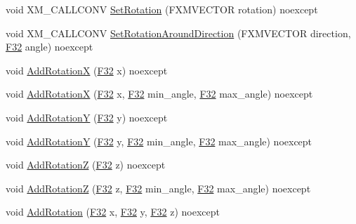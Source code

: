 \begin{DoxyCompactItemize}
\item 
void X\+M\+\_\+\+C\+A\+L\+L\+C\+O\+NV \mbox{\hyperlink{classmage_1_1_transform_a66ddc77bfbbf0b66e00d5ec8e10d1d65}{Set\+Rotation}} (F\+X\+M\+V\+E\+C\+T\+OR rotation) noexcept
\item 
void X\+M\+\_\+\+C\+A\+L\+L\+C\+O\+NV \mbox{\hyperlink{classmage_1_1_transform_abcf9353c078e2556543919e0852abb05}{Set\+Rotation\+Around\+Direction}} (F\+X\+M\+V\+E\+C\+T\+OR direction, \mbox{\hyperlink{namespacemage_aa97e833b45f06d60a0a9c4fc22ae02c0}{F32}} angle) noexcept
\item 
void \mbox{\hyperlink{classmage_1_1_transform_a920bcbc350d3896bd1d8f9f6233cc008}{Add\+RotationX}} (\mbox{\hyperlink{namespacemage_aa97e833b45f06d60a0a9c4fc22ae02c0}{F32}} x) noexcept
\item 
void \mbox{\hyperlink{classmage_1_1_transform_a7d8d633022365c5d78c293dec6179f3b}{Add\+RotationX}} (\mbox{\hyperlink{namespacemage_aa97e833b45f06d60a0a9c4fc22ae02c0}{F32}} x, \mbox{\hyperlink{namespacemage_aa97e833b45f06d60a0a9c4fc22ae02c0}{F32}} min\+\_\+angle, \mbox{\hyperlink{namespacemage_aa97e833b45f06d60a0a9c4fc22ae02c0}{F32}} max\+\_\+angle) noexcept
\item 
void \mbox{\hyperlink{classmage_1_1_transform_ab9e20e922cd6e651a984480aa0aa6752}{Add\+RotationY}} (\mbox{\hyperlink{namespacemage_aa97e833b45f06d60a0a9c4fc22ae02c0}{F32}} y) noexcept
\item 
void \mbox{\hyperlink{classmage_1_1_transform_aba11b5ece5d2885d18a97178b908e16b}{Add\+RotationY}} (\mbox{\hyperlink{namespacemage_aa97e833b45f06d60a0a9c4fc22ae02c0}{F32}} y, \mbox{\hyperlink{namespacemage_aa97e833b45f06d60a0a9c4fc22ae02c0}{F32}} min\+\_\+angle, \mbox{\hyperlink{namespacemage_aa97e833b45f06d60a0a9c4fc22ae02c0}{F32}} max\+\_\+angle) noexcept
\item 
void \mbox{\hyperlink{classmage_1_1_transform_a973e713992328de9f5ad3b6ed4779f40}{Add\+RotationZ}} (\mbox{\hyperlink{namespacemage_aa97e833b45f06d60a0a9c4fc22ae02c0}{F32}} z) noexcept
\item 
void \mbox{\hyperlink{classmage_1_1_transform_ab29a1d0cc20f7fd1975cef8e8c1b1b62}{Add\+RotationZ}} (\mbox{\hyperlink{namespacemage_aa97e833b45f06d60a0a9c4fc22ae02c0}{F32}} z, \mbox{\hyperlink{namespacemage_aa97e833b45f06d60a0a9c4fc22ae02c0}{F32}} min\+\_\+angle, \mbox{\hyperlink{namespacemage_aa97e833b45f06d60a0a9c4fc22ae02c0}{F32}} max\+\_\+angle) noexcept
\item 
void \mbox{\hyperlink{classmage_1_1_transform_a3204b0669d2735a4c05af1f6e10b46b1}{Add\+Rotation}} (\mbox{\hyperlink{namespacemage_aa97e833b45f06d60a0a9c4fc22ae02c0}{F32}} x, \mbox{\hyperlink{namespacemage_aa97e833b45f06d60a0a9c4fc22ae02c0}{F32}} y, \mbox{\hyperlink{namespacemage_aa97e833b45f06d60a0a9c4fc22ae02c0}{F32}} z) noexcept

\end{DoxyCompactItemize}
